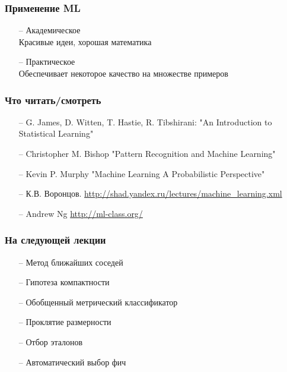 \documentclass[12pt]{beamer}
\begin{document}
\begin{frame}\frametitle{Применение ML}
\begin{itemize}
  \item[--] Академическое\\
Красивые идеи, хорошая математика
  \item[--] Практическое\\
  Обеспечивает некоторое качество на множестве примеров\\
\end{itemize}
\end{frame}

\begin{frame}\frametitle{Что читать/смотреть}
\begin{itemize}
  \item[--] G. James, D. Witten, T. Hastie, R. Tibshirani: "An Introduction to Statistical Learning" 
  \item[--] Christopher M. Bishop "Pattern Recognition and Machine Learning"
  \item[--] Kevin P. Murphy "Machine Learning A Probabilistic Perspective"
  \vspace{10mm}
  \item[--] К.В. Воронцов. \url{http://shad.yandex.ru/lectures/machine_learning.xml}
  \item[--] Andrew Ng \url{http://ml-class.org/}
\end{itemize}
\end{frame}

\begin{frame}\frametitle{На следующей лекции}
\begin{itemize}
  \item[--] Метод ближайших соседей
  \item[--] Гипотеза компактности
  \item[--] Обобщенный метрический классификатор
  \item[--] Проклятие размерности  
  \item[--] Отбор эталонов    
  \item[--] Автоматический выбор фич  
\end{itemize}
\end{frame}
\end{document}
